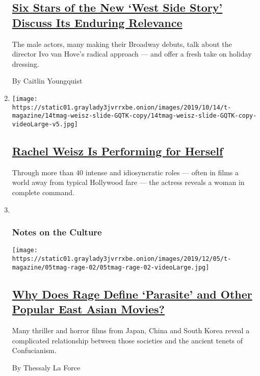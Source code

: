 \begin{enumerate}
  \hypertarget{six-stars-of-the-new-west-side-story-discuss-its-enduring-relevance}{%
  \subsection{\texorpdfstring{\href{/2019/12/18/t-magazine/west-side-story-broadway.html}{Six
  Stars of the New `West Side Story' Discuss Its Enduring
  Relevance}}{Six Stars of the New `West Side Story' Discuss Its Enduring Relevance}}\label{six-stars-of-the-new-west-side-story-discuss-its-enduring-relevance}}

  The male actors, many making their Broadway debuts, talk about the
  director Ivo van Hove's radical approach --- and offer a fresh take on
  holiday dressing.

  By Caitlin Youngquist
\item
  \texttt{[image: https://static01.graylady3jvrrxbe.onion/images/2019/10/14/t-magazine/14tmag-weisz-slide-GQTK-copy/14tmag-weisz-slide-GQTK-copy-videoLarge-v5.jpg]}

  \hypertarget{rachel-weisz-is-performing-for-herself}{%
  \subsection{\texorpdfstring{\href{/interactive/2019/10/15/t-magazine/rachel-weisz-acting-movies.html}{Rachel
  Weisz Is Performing for
  Herself}}{Rachel Weisz Is Performing for Herself}}\label{rachel-weisz-is-performing-for-herself}}

  Through more than 40 intense and idiosyncratic roles --- often in
  films a world away from typical Hollywood fare --- the actress reveals
  a woman in complete command.
\item ~
  \hypertarget{notes-on-the-culture-1}{%
  \subsubsection{Notes on the Culture}\label{notes-on-the-culture-1}}

  \texttt{[image: https://static01.graylady3jvrrxbe.onion/images/2019/12/05/t-magazine/05tmag-rage-02/05tmag-rage-02-videoLarge.jpg]}

  \hypertarget{why-does-rage-define-parasite-and-other-popular-east-asian-movies}{%
  \subsection{\texorpdfstring{\href{/2019/11/25/t-magazine/asia-movies-parasite.html}{Why
  Does Rage Define `Parasite' and Other Popular East Asian
  Movies?}}{Why Does Rage Define `Parasite' and Other Popular East Asian Movies?}}\label{why-does-rage-define-parasite-and-other-popular-east-asian-movies}}

  Many thriller and horror films from Japan, China and South Korea
  reveal a complicated relationship between those societies and the
  ancient tenets of Confucianism.

  By Thessaly La Force
\end{enumerate}


